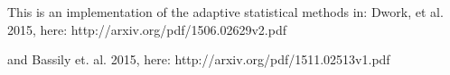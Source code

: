This is an implementation of the adaptive statistical methods in:
 Dwork, et al. 2015, here: http://arxiv.org/pdf/1506.02629v2.pdf

and Bassily et. al. 2015, here: http://arxiv.org/pdf/1511.02513v1.pdf
